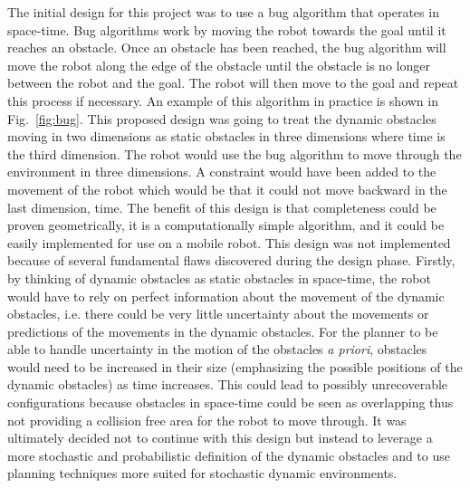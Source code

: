 The initial design for this project was to use a bug algorithm that operates in
space-time. Bug algorithms work by moving the robot towards the goal until it
reaches an obstacle. Once an obstacle has been reached, the bug algorithm will
move the robot along the edge of the obstacle until the obstacle is no longer
between the robot and the goal. The robot will then move to the goal and repeat
this process if necessary. An example of this algorithm in practice is shown in
Fig.~\ref{fig:bug}. This proposed design was going to treat the dynamic
obstacles moving in two dimensions as static obstacles in three dimensions
where time is the third dimension. The robot would use the bug algorithm to
move through the environment in three dimensions. A constraint would have been
added to the movement of the robot which would be that it could not move
backward in the last dimension, time.  The benefit of this design is that
completeness could be proven geometrically, it is a computationally simple
algorithm, and it could be easily implemented for use on a mobile robot. This
design was not implemented because of several fundamental flaws discovered
during the design phase. Firstly, by thinking of dynamic obstacles as static
obstacles in space-time, the robot would have to rely on perfect information
about the movement of the dynamic obstacles, i.e.  there could be very little
uncertainty about the movements or predictions of the movements in the dynamic
obstacles. For the planner to be able to handle uncertainty in the motion of
the obstacles \emph{a priori}, obstacles would need to be increased in their
size (emphasizing the possible positions of the dynamic obstacles) as time
increases. This could lead to possibly unrecoverable configurations because
obstacles in space-time could be seen as overlapping thus not providing a
collision free area for the robot to move through. It was ultimately decided
not to continue with this design but instead to leverage a more stochastic and
probabilistic definition of the dynamic obstacles and to use planning
techniques more suited for stochastic dynamic environments.


